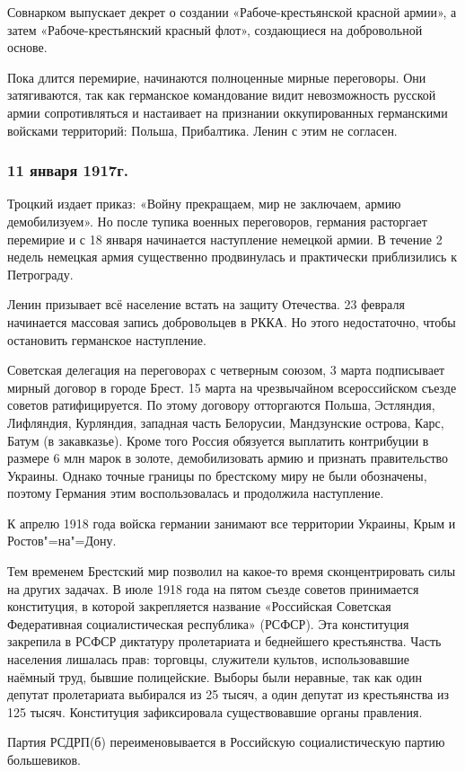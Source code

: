 Совнарком выпускает декрет о создании «Рабоче-крестьянской красной армии», а затем «Рабоче-крестьянский красный флот», создающиеся на добровольной основе.

Пока длится перемирие, начинаются полноценные мирные переговоры. Они затягиваются, так как германское командование видит невозможность русской армии сопротивляться и настаивает на признании оккупированных германскими войсками территорий: Польша, Прибалтика. Ленин с этим не согласен.

\subsubsection{\textbf{11 января 1917г.}}

Троцкий издает приказ: «Войну прекращаем, мир не заключаем, армию демобилизуем». Но после тупика военных переговоров, германия расторгает перемирие и с 18 января начинается наступление немецкой армии. В течение 2 недель немецкая армия существенно продвинулась и практически приблизились к Петрограду.

Ленин призывает всё население встать на защиту Отечества. 23 февраля начинается массовая запись добровольцев в РККА. Но этого недостаточно, чтобы остановить германское наступление.

Советская делегация на переговорах с четверным союзом, 3 марта подписывает мирный договор в городе Брест. 15 марта на чрезвычайном всероссийском съезде советов ратифицируется. По этому договору отторгаются Польша, Эстляндия, Лифляндия, Курляндия, западная часть Белорусии, Мандзунские острова, Карс, Батум (в закавказье). Кроме того Россия обязуется выплатить контрибуции в размере 6 млн марок в золоте, демобилизовать армию и признать правительство Украины. Однако точные границы по брестскому миру не были обозначены, поэтому Германия этим воспользовалась и продолжила наступление.

К апрелю 1918 года войска германии занимают все территории Украины, Крым и Ростов"=на"=Дону.

Тем временем Брестский мир позволил на какое-то время сконцентрировать силы на других задачах. В июле 1918 года на пятом съезде советов принимается конституция, в которой закрепляется название «Российская Советская Федеративная социалистическая республика» (РСФСР). Эта конституция закрепила в РСФСР диктатуру пролетариата и беднейшего крестьянства. Часть населения лишалась прав: торговцы, служители культов, использовавшие наёмный труд, бывшие полицейские. Выборы были неравные, так как один депутат пролетариата выбирался из 25 тысяч, а один депутат из крестьянства из 125 тысяч. Конституция зафиксировала существовавшие органы правления.

Партия РСДРП(б) переименовывается в Российскую социалистическую партию большевиков.